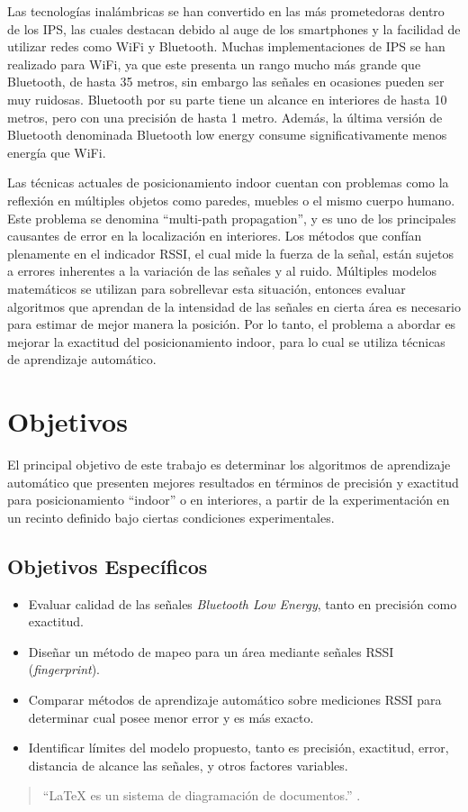 Las tecnologías inalámbricas se han convertido en las más prometedoras dentro de los IPS, las cuales destacan debido al auge de los smartphones y la facilidad de utilizar redes como WiFi y Bluetooth. Muchas implementaciones de IPS se han realizado para WiFi, ya que este presenta un rango mucho más grande que Bluetooth, de hasta 35 metros, sin embargo las señales en ocasiones pueden ser muy ruidosas. Bluetooth por su parte tiene un alcance en interiores de hasta 10 metros, pero con una precisión de hasta 1 metro.  Además, la última versión de Bluetooth denominada Bluetooth low energy consume significativamente menos energía que WiFi.

Las técnicas actuales de posicionamiento indoor cuentan con problemas como la reflexión en múltiples objetos como paredes, muebles o el mismo cuerpo humano. Este problema se denomina  “multi-path propagation”, y es uno de los principales causantes de error en la localización en interiores. Los métodos que confían plenamente en el indicador RSSI, el cual mide la fuerza de la señal, están sujetos a errores inherentes a la variación de las señales y al ruido.  Múltiples modelos matemáticos se utilizan para sobrellevar esta situación, entonces evaluar algoritmos que aprendan de la intensidad de las señales en cierta área es necesario para estimar de mejor manera la posición. Por lo tanto, el problema a abordar es mejorar la exactitud del posicionamiento indoor, para lo cual se utiliza técnicas de aprendizaje automático.

\section{Objetivos}

El principal objetivo de este trabajo es determinar los algoritmos de aprendizaje automático que presenten mejores resultados en términos de precisión y exactitud para posicionamiento ``indoor'' o en interiores, a partir de la experimentación en un recinto definido bajo ciertas condiciones experimentales.

\subsection{Objetivos Específicos}

\begin{itemize}
\item Evaluar calidad de las señales \textit{Bluetooth Low Energy}, tanto en precisión como exactitud.

\item Diseñar un método de mapeo para un área mediante señales RSSI (\textit{fingerprint}).

\item Comparar métodos de aprendizaje automático sobre mediciones RSSI para determinar cual posee menor error y es más exacto.

\item Identificar límites del modelo propuesto, tanto es precisión, exactitud, error, distancia de alcance las señales, y otros factores variables.

\end{itemize}

\begin{quote}
    ``\LaTeX{} es un sistema de diagramación de documentos.'' \citep{Lamport94}.
\end{quote}


\newpage

